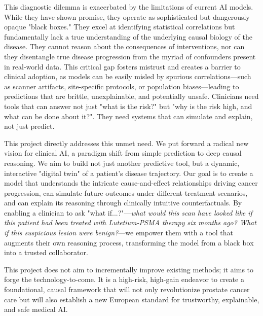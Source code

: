 \documentclass[11pt, a4paper]{article}
\begin{document}
This diagnostic dilemma is exacerbated by the limitations of current AI models. While they have shown promise, they operate as sophisticated but dangerously opaque "black boxes." They excel at identifying statistical correlations but fundamentally lack a true understanding of the underlying causal biology of the disease. They cannot reason about the consequences of interventions, nor can they disentangle true disease progression from the myriad of confounders present in real-world data. This critical gap fosters mistrust and creates a barrier to clinical adoption, as models can be easily misled by spurious correlations—such as scanner artifacts, site-specific protocols, or population biases—leading to predictions that are brittle, unexplainable, and potentially unsafe. Clinicians need tools that can answer not just "what is the risk?" but "why is the risk high, and what can be done about it?". They need systems that can simulate and explain, not just predict.

This project directly addresses this unmet need. We put forward a radical new vision for clinical AI, a paradigm shift from simple prediction to deep causal reasoning. We aim to build not just another predictive tool, but a dynamic, interactive "digital twin" of a patient's disease trajectory. Our goal is to create a model that understands the intricate cause-and-effect relationships driving cancer progression, can simulate future outcomes under different treatment scenarios, and can explain its reasoning through clinically intuitive counterfactuals. By enabling a clinician to ask "what if...?"—\textit{what would this scan have looked like if this patient had been treated with Lutetium-PSMA therapy six months ago? What if this suspicious lesion were benign?}—we empower them with a tool that augments their own reasoning process, transforming the model from a black box into a trusted collaborator.

This project does not aim to incrementally improve existing methods; it aims to forge the technology-to-come. It is a high-risk, high-gain endeavor to create a foundational, causal framework that will not only revolutionize prostate cancer care but will also establish a new European standard for trustworthy, explainable, and safe medical AI.
\end{document}
